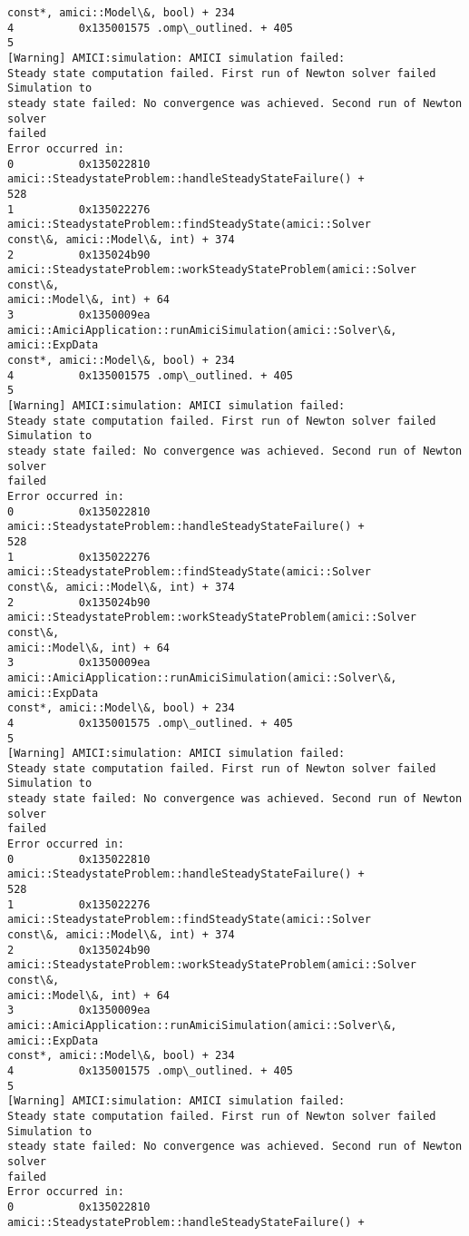 \documentclass[11pt]{article}
\begin{document}
\begin{Verbatim}[commandchars=\\\{\}]
const*, amici::Model\&, bool) + 234
4          0x135001575 .omp\_outlined. + 405
5
[Warning] AMICI:simulation: AMICI simulation failed:
Steady state computation failed. First run of Newton solver failed Simulation to
steady state failed: No convergence was achieved. Second run of Newton solver
failed
Error occurred in:
0          0x135022810 amici::SteadystateProblem::handleSteadyStateFailure() +
528
1          0x135022276 amici::SteadystateProblem::findSteadyState(amici::Solver
const\&, amici::Model\&, int) + 374
2          0x135024b90
amici::SteadystateProblem::workSteadyStateProblem(amici::Solver const\&,
amici::Model\&, int) + 64
3          0x1350009ea
amici::AmiciApplication::runAmiciSimulation(amici::Solver\&, amici::ExpData
const*, amici::Model\&, bool) + 234
4          0x135001575 .omp\_outlined. + 405
5
[Warning] AMICI:simulation: AMICI simulation failed:
Steady state computation failed. First run of Newton solver failed Simulation to
steady state failed: No convergence was achieved. Second run of Newton solver
failed
Error occurred in:
0          0x135022810 amici::SteadystateProblem::handleSteadyStateFailure() +
528
1          0x135022276 amici::SteadystateProblem::findSteadyState(amici::Solver
const\&, amici::Model\&, int) + 374
2          0x135024b90
amici::SteadystateProblem::workSteadyStateProblem(amici::Solver const\&,
amici::Model\&, int) + 64
3          0x1350009ea
amici::AmiciApplication::runAmiciSimulation(amici::Solver\&, amici::ExpData
const*, amici::Model\&, bool) + 234
4          0x135001575 .omp\_outlined. + 405
5
[Warning] AMICI:simulation: AMICI simulation failed:
Steady state computation failed. First run of Newton solver failed Simulation to
steady state failed: No convergence was achieved. Second run of Newton solver
failed
Error occurred in:
0          0x135022810 amici::SteadystateProblem::handleSteadyStateFailure() +
528
1          0x135022276 amici::SteadystateProblem::findSteadyState(amici::Solver
const\&, amici::Model\&, int) + 374
2          0x135024b90
amici::SteadystateProblem::workSteadyStateProblem(amici::Solver const\&,
amici::Model\&, int) + 64
3          0x1350009ea
amici::AmiciApplication::runAmiciSimulation(amici::Solver\&, amici::ExpData
const*, amici::Model\&, bool) + 234
4          0x135001575 .omp\_outlined. + 405
5
[Warning] AMICI:simulation: AMICI simulation failed:
Steady state computation failed. First run of Newton solver failed Simulation to
steady state failed: No convergence was achieved. Second run of Newton solver
failed
Error occurred in:
0          0x135022810 amici::SteadystateProblem::handleSteadyStateFailure() +

\end{Verbatim}
\end{document}
